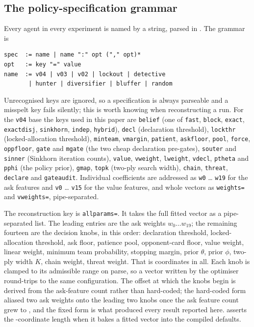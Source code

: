 \subsection{The policy-specification grammar}
\label{app:repro-spec}

Every agent in every experiment is named by a string, parsed in
. The grammar is

\begin{verbatim}
spec  := name | name ":" opt ("," opt)*
opt   := key "=" value
name  := v04 | v03 | v02 | lockout | detective
       | hunter | diversifier | bluffer | random
\end{verbatim}

Unrecognised keys are ignored, so a specification is always parseable and a
misspelt key fails silently; this is worth knowing when reconstructing a run.
For the \texttt{v04} base the keys used in this paper are
\texttt{belief} (one of \texttt{fast}, \texttt{block}, \texttt{exact},
\texttt{exactdisj}, \texttt{sinkhorn}, \texttt{indep}, \texttt{hybrid}),
\texttt{decl} (declaration threshold), \texttt{lockthr} (locked-allocation
threshold), \texttt{minteam}, \texttt{vmargin}, \texttt{patient},
\texttt{askfloor}, \texttt{pool}, \texttt{force}, \texttt{oppfloor},
\texttt{gate} and \texttt{mgate} (the two cheap declaration pre-gates),
\texttt{souter} and \texttt{sinner} (Sinkhorn iteration counts), \texttt{value},
\texttt{vweight}, \texttt{lweight}, \texttt{vdecl}, \texttt{ptheta} and
\texttt{pphi} (the policy prior), \texttt{gmap}, \texttt{topk} (two-ply search
width), \texttt{chain}, \texttt{threat}, \texttt{declare} and
\texttt{gateaudit}. Individual coefficients are addressed as \texttt{w0}
\ldots{} \texttt{w19} for the \numAskFeats{} ask features and \texttt{v0}
\ldots{} \texttt{v15} for the \numValueFeats{} value features, and whole vectors
as \texttt{weights=} and \texttt{vweights=}, pipe-separated.

The reconstruction key is \texttt{allparams=}. It takes the full fitted vector
as a pipe-separated list. The leading \numAskFeats{} entries are the ask weights
$w_0 \ldots w_{19}$; the remaining fourteen are the decision knobs, in this
order: declaration threshold, locked-allocation threshold, ask floor, patience
pool, opponent-card floor, value weight, linear weight, minimum team
probability, stopping margin, prior $\theta$, prior $\phi$, two-ply width $K$,
chain weight, threat weight. That is \numParams{} coordinates in all. Each knob
is clamped to its admissible range on parse, so a vector written by the
optimiser round-trips to the same configuration. The offset at which the knobs
begin is derived from the ask-feature count rather than hard-coded; the
hard-coded form aliased two ask weights onto the leading two knobs once the ask
feature count grew to \numAskFeats{}, and the fixed form is what produced every
result reported here.  asserts the
\numParams{}-coordinate length when it bakes a fitted vector into the compiled
defaults.

